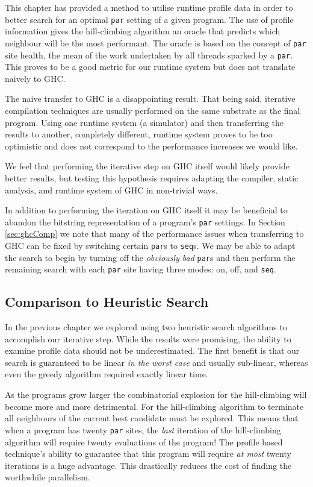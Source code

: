This chapter has provided a method to utilise runtime profile data in order to
better search for an optimal \verb|par| setting of a given program. The use
of profile information gives the hill-climbing algorithm an oracle that
predicts which neighbour will be the most performant. The oracle is based
on the concept of \verb|par| site health, the mean of the work undertaken
by all threads sparked by a \verb|par|. This proves to be a good metric
for our runtime system but does not translate naively to GHC.

The naive transfer to GHC is a disappointing result. That being said, iterative
compilation techniques are usually performed on the same substrate as the final
program. Using one runtime system (a simulator) and then transferring the
results to another, completely different, runtime system proves to be too
optimistic and does not correspond to the performance increases we would like.

We feel that performing the iterative step on GHC itself would likely
provide better results, but testing this hypothesis requires adapting the
compiler, static analysis, and runtime system of GHC in non-trivial ways.

In addition to performing the iteration on GHC itself it may be beneficial to
abandon the bitstring representation of a program's \verb|par| settings. In
Section \ref{sec:ghcComp} we note that many of the performance issues when
transferring to GHC can be fixed by switching certain \verb|par|s to
\verb|seq|s. We may be able to adapt the search to begin by turning off the
\emph{obviously bad} \verb|par|s and then perform the remaining search with
each \verb|par| site having three modes: on, off, and \verb|seq|.

\subsection{Comparison to Heuristic Search}

In the previous chapter we explored using two heuristic search algorithms to
accomplish our iterative step. While the results were promising, the ability to
examine profile data should not be underestimated. The first benefit is that
our search is guaranteed to be linear \emph{in the worst case} and usually
sub-linear, whereas even the greedy algorithm required exactly linear time.

As the programs grow larger the combinatorial explosion for the hill-climbing
will become more and more detrimental. For the hill-climbing algorithm to
terminate all neighbours of the current best candidate must be explored. This
means that when a program has twenty \verb|par| sites, the \emph{last}
iteration of the hill-climbing algorithm will require twenty evaluations of the
program! The profile based technique's ability to guarantee that this program
will require \emph{at most} twenty iterations is a huge advantage. This
drastically reduces the cost of finding the worthwhile parallelism.
